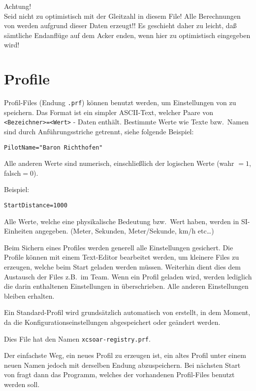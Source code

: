 Achtung!\\
Seid nicht zu optimistisch mit der Gleitzahl in diesem File!
\tip Alle Berechnungen von  \xc werden aufgrund dieser Daten erzeugt!!  Es geschieht daher zu
leicht, daß sämtliche Endanflüge auf dem Acker enden, wenn hier zu optimistisch
eingegeben wird!


\section{Profile}
Profil-Files (Endung \verb|.prf|) können benutzt werden, um Einstellungen von \xc zu speichern.
Das Format ist ein simpler ASCII-Text, welcher Paare von  \verb|<Bezeichner>=<Wert>|  - Daten enthält.
Bestimmte Werte wie Texte bzw.\ Namen sind durch Anführungsstriche getrennt, siehe folgende Beispiel:

\begin{verbatim}
PilotName="Baron Richthofen"
\end{verbatim}

Alle anderen Werte sind numerisch, einschließlich der logischen Werte (wahr $=1$, falsch$=0$).

Beispiel:


\begin{verbatim}
StartDistance=1000
\end{verbatim}

Alle Werte, welche eine physikalische Bedeutung bzw.\ Wert haben, werden in \textsf{SI}-Einheiten angegeben.
(Meter, Sekunden, Meter/Sekunde, km/h etc\dots)

Beim Sichern eines Profiles werden generell alle Einstellungen gesichert.
Die Profile können mit einem Text-Editor bearbeitet werden, um kleinere Files zu erzeugen,
welche beim Start geladen werden müssen. Weiterhin dient dies dem Austausch der Files
z.B.\ im Team. Wenn ein Profil geladen wird, werden lediglich die darin enthaltenen
Einstellungen in \xc überschrieben. Alle anderen Einstellungen bleiben erhalten.

Ein Standard-Profil wird grundsätzlich automatisch von  \xc erstellt, in dem Moment, da
die Konfigurationseinstellungen abgespeichert oder geändert werden.

Dies File hat den Namen  \verb|xcsoar-registry.prf|.

Der einfachste Weg, ein neues Profil zu erzeugen ist, ein altes Profil unter einem neuen
Namen jedoch mit derselben Endung abzuspeichern. Bei nächsten Start von \xc  fragt dann das Programm, welches der vorhandenen Profil-Files benutzt werden soll.


